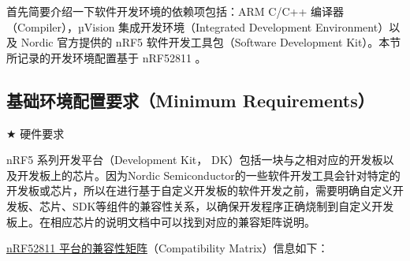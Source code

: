 \documentclass{WHUResearch}  %
\begin{document}
首先简要介绍一下软件开发环境的依赖项包括：ARM C/C++ 编译器（Compiler），µVision 集成开发环境（Integrated Development Environment）以及 Nordic 官方提供的 nRF5 软件开发工具包（Software Development Kit）。本节所记录的开发环境配置基于 nRF52811 。

\subsection{基础环境配置要求（Minimum Requirements）}

$\bigstar$ 硬件要求

nRF5 系列开发平台（Development Kit， DK）包括一块与之相对应的开发板以及开发板上的芯片。因为Nordic Semiconductor的一些软件开发工具会针对特定的开发板或芯片，所以在进行基于自定义开发板的软件开发之前，需要明确自定义开发板、芯片、SDK等组件的兼容性关系，以确保开发程序正确烧制到自定义开发板上。在相应芯片的说明文档中可以找到对应的兼容矩阵说明。

\href{https://infocenter.nordicsemi.com/index.jsp?topic=\%2Fcomp_matrix_nrf52811\%2FCOMP\%2Fnrf52811\%2Fnrf52811_comp_matrix.html&cp=3_2_2}{nRF52811 平台的兼容性矩阵}（Compatibility Matrix）信息如下：
\end{document}
